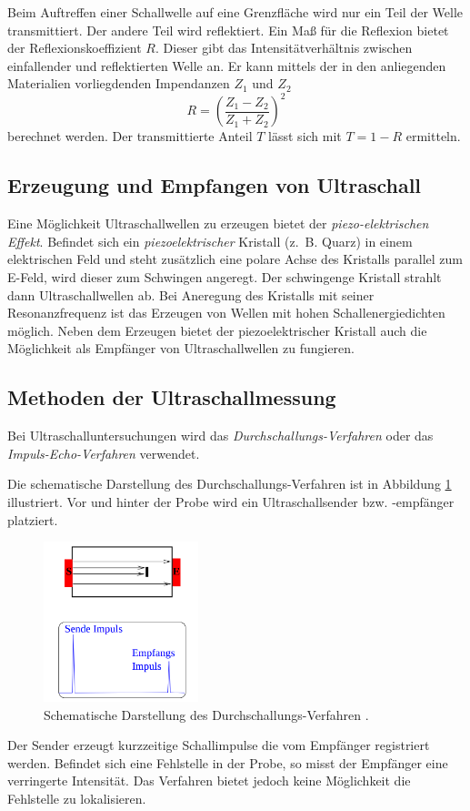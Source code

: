 Beim Auftreffen einer Schallwelle auf eine Grenzfläche wird nur ein Teil der
Welle transmittiert. Der andere Teil wird reflektiert.
Ein Maß für die Reflexion bietet der Reflexionskoeffizient $R$.
Dieser gibt das Intensitätverhältnis zwischen einfallender und reflektierten Welle an.
Er kann mittels der in den anliegenden Materialien vorliegdenden Impendanzen $Z_1$ und $Z_2$
\begin{equation*}
  R=\left(\frac{Z_1-Z_2}{Z_1+Z_2}\right)^2
\end{equation*}
berechnet werden.
Der transmittierte Anteil $T$ lässt sich mit $T=1-R$ ermitteln.

\subsection{Erzeugung und Empfangen von Ultraschall}

Eine Möglichkeit Ultraschallwellen zu erzeugen bietet der \emph{piezo-elektrischen Effekt}.
Befindet sich ein \emph{piezoelektrischer} Kristall (z.\, B. Quarz) in einem elektrischen Feld und steht
zusätzlich eine polare Achse des Kristalls parallel zum E-Feld, wird dieser %
zum Schwingen angeregt. Der schwingenge Kristall strahlt dann Ultraschallwellen ab.
Bei Aneregung des Kristalls mit seiner Resonanzfrequenz ist das Erzeugen von Wellen mit hohen %
Schallenergiedichten möglich. %
Neben dem Erzeugen bietet der piezoelektrischer Kristall auch die Möglichkeit
als Empfänger von Ultraschallwellen zu fungieren.

\subsection{Methoden der Ultraschallmessung}
Bei Ultraschalluntersuchungen wird das \emph{Durchschallungs-Verfahren} oder
das \emph{Impuls-Echo-Verfahren} verwendet.

Die schematische Darstellung des Durchschallungs-Verfahren ist in Abbildung
\ref{fig: durch} illustriert. Vor und hinter der Probe wird ein Ultraschallsender bzw. -empfänger
platziert.
\begin{figure}[h]
  \centering
  \includegraphics[width=0.4\textwidth]{pics/durchsall.png}
  \caption{Schematische Darstellung des Durchschallungs-Verfahren \cite{anleitungus1}.}
  \label{fig: durch}
  \end{figure}
Der Sender erzeugt kurzzeitige Schallimpulse die vom Empfänger
registriert werden. Befindet sich eine Fehlstelle in der Probe, so misst der Empfänger
eine verringerte Intensität.
Das Verfahren bietet jedoch keine Möglichkeit die Fehlstelle zu lokalisieren. %

